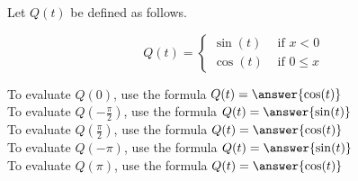 \documentclass{ximera}
\author{Lee Wayand}
\begin{document}
\begin{exercise}




Let $Q(t)$ be defined as follows.

\[
Q(t) = 
\begin{cases}
  \sin(t) & \text{ if }  x < 0 \\
  \cos(t) & \text{ if } 0 \leq x 
\end{cases}
\]



To evaluate $Q(0)$, use the formula $Q(t) = \answer{\cos(t)}$ \\


To evaluate $Q\left( -\frac{\pi}{2} \right)$, use the formula $Q(t) = \answer{\sin(t)}$ \\


To evaluate $Q\left( \frac{\pi}{2} \right)$, use the formula $Q(t) = \answer{\cos(t)}$ \\


To evaluate $Q(-\pi)$, use the formula $Q(t) = \answer{\sin(t)}$ \\


To evaluate $Q(\pi)$, use the formula $Q(t) = \answer{\cos(t)}$ \\




\end{exercise}
\end{document}
